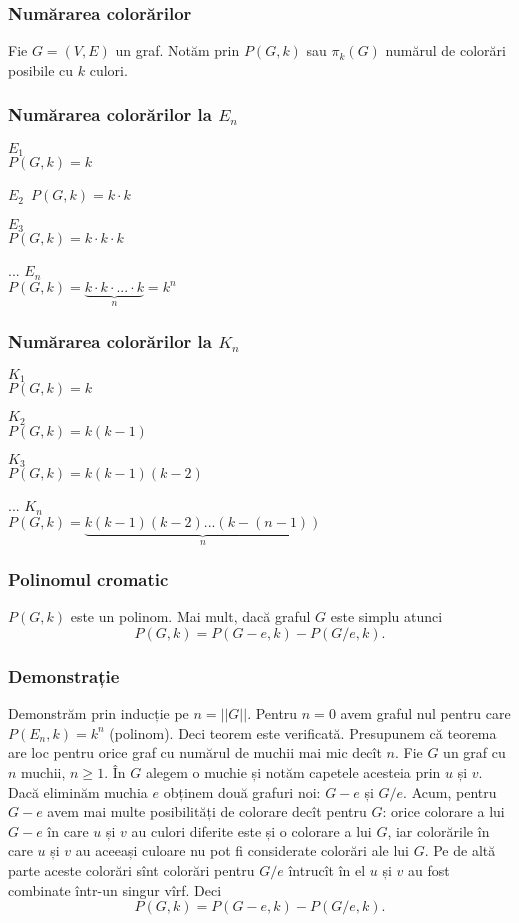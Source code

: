 \begin{frame}
  \frametitle{Numărarea colorărilor}

Fie $G=(V,E)$ un graf. Notăm prin $P(G,k)$ sau $\pi_k(G)$ numărul de colorări 
posibile cu $k$ culori.
 
\end{frame}

\begin{frame}
 \frametitle{Numărarea colorărilor la $E_n$}

$E_1$\\
$P(G,k)=k$

$E_2$\
$P(G,k)=k\cdot k$

$E_3$\\
$P(G,k)=k\cdot k\cdot k$

...
$E_n$\\
$P(G,k)=\underbrace{k\cdot k\cdot ... \cdot k}_{n} = k^n$

\end{frame}

\begin{frame}
 \frametitle{Numărarea colorărilor la $K_n$}

$K_1$\\
$P(G,k)=k$

$K_2$\\
$P(G,k)=k(k-1)$

$K_3$\\
$P(G,k)=k(k-1)(k-2)$

...
$K_n$\\
$P(G,k)=\underbrace{k(k-1)(k-2)...(k-(n-1))}_{n}$
\end{frame}

\begin{frame}[allowframebreaks]
\frametitle{Polinomul cromatic}
\begin{theorem}
$P(G,k)$ este un polinom. Mai mult, dacă graful $G$ este simplu atunci 
\[
  P(G,k) = P(G-e,k) - P(G/e,k).
\]
\end{theorem}
\end{frame}

\begin{frame}[allowframebreaks]
\frametitle{Demonstrație}
Demonstrăm prin inducție pe $n=||G||$. Pentru $n=0$ avem graful nul pentru 
care $P(E_n,k) = k^n$ (polinom). Deci teorem este verificată.
\newpage
Presupunem că teorema are loc pentru orice graf cu numărul de muchii mai mic 
decît $n$. Fie $G$ un graf cu $n$ muchii, $n\geq 1$. În $G$ alegem o muchie și 
notăm capetele acesteia prin $u$ și $v$. Dacă eliminăm muchia $e$ obținem două 
grafuri noi: $G-e$ și $G/e$. 
\newpage
Acum, pentru $G-e$ avem mai multe posibilități de colorare decît pentru $G$: 
orice colorare a lui $G-e$ în care $u$ și $v$ au culori diferite este și o 
colorare a lui $G$, iar colorările în care $u$ și $v$ au aceeași culoare nu 
pot fi considerate colorări ale lui $G$.
\newpage
Pe de altă parte aceste colorări sînt colorări pentru $G/e$ întrucît în el 
$u$ și $v$ au fost combinate într-un singur vîrf. Deci
\[
  P(G,k) = P(G-e,k) - P(G/e,k).
\]


\end{frame}

